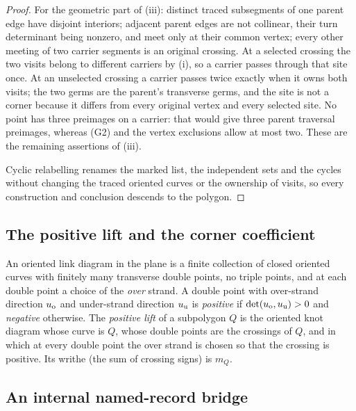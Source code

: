 \begin{proof}
For the geometric part of (iii): distinct traced subsegments of one parent
edge have disjoint interiors; adjacent parent edges are not collinear,
their turn determinant being nonzero, and meet only at their common vertex;
every other meeting of two carrier segments is an original crossing. At a
selected crossing the two visits belong to different carriers by (i), so a
carrier passes through that site once. At an unselected crossing a carrier
passes twice exactly when it owns both visits; the two germs are the
parent's transverse germs, and the site is not a corner because it differs
from every original vertex and every selected site. No point has three
preimages on a carrier: that would give three parent traversal preimages,
whereas (G2) and the vertex exclusions allow at most two. These are the
remaining assertions of (iii).

Cyclic relabelling renames the marked list, the independent sets and the
cycles without changing the traced oriented curves or the ownership of
visits, so every construction and conclusion descends to the polygon.
\end{proof}

\subsection{The positive lift and the corner coefficient}

\begin{definition}\label{def:positive-lift}
An oriented link diagram in the plane is a finite collection of closed
oriented curves with finitely many transverse double points, no triple points,
and at each double point a choice of the \emph{over} strand. A double point
with over-strand direction $u_{\rm o}$ and under-strand direction $u_{\rm u}$
is \emph{positive} if $\det(u_{\rm o},u_{\rm u})>0$ and \emph{negative}
otherwise. The \emph{positive lift} of a subpolygon $Q$ is the oriented knot
diagram whose curve is $Q$, whose double points are the crossings of $Q$, and
in which at every double point the over strand is chosen so that the crossing
is positive. Its writhe (the sum of crossing signs) is $m_Q$.
\end{definition}

\subsection{An internal named-record bridge}

